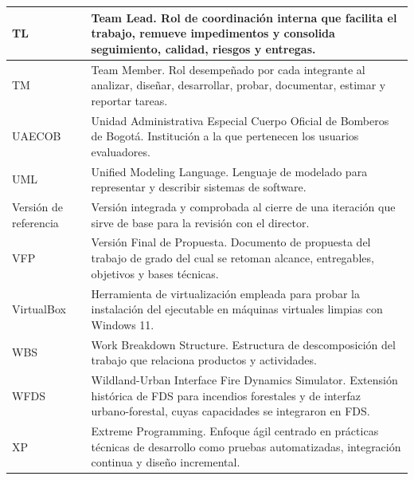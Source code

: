 \begin{longtable}{|p{0.29\dimexpr\linewidth-23pt\relax}|p{0.71\dimexpr\linewidth-23pt\relax}|}
TL & Team Lead. Rol de coordinación interna que facilita el trabajo, remueve impedimentos y consolida seguimiento, calidad, riesgos y entregas.\\\hline
TM & Team Member. Rol desempeñado por cada integrante al analizar, diseñar, desarrollar, probar, documentar, estimar y reportar tareas.\\\hline
UAECOB & Unidad Administrativa Especial Cuerpo Oficial de Bomberos de Bogotá. Institución a la que pertenecen los usuarios evaluadores.\\\hline
UML & Unified Modeling Language. Lenguaje de modelado para representar y describir sistemas de software.\\\hline
Versión de referencia & Versión integrada y comprobada al cierre de una iteración que sirve de base para la revisión con el director.\\\hline
VFP & Versión Final de Propuesta. Documento de propuesta del trabajo de grado del cual se retoman alcance, entregables, objetivos y bases técnicas.\\\hline
VirtualBox & Herramienta de virtualización empleada para probar la instalación del ejecutable en máquinas virtuales limpias con Windows 11.\\\hline
WBS & Work Breakdown Structure. Estructura de descomposición del trabajo que relaciona productos y actividades.\\\hline
WFDS & Wildland-Urban Interface Fire Dynamics Simulator. Extensión histórica de FDS para incendios forestales y de interfaz urbano-forestal, cuyas capacidades se integraron en FDS.\\\hline
XP & Extreme Programming. Enfoque ágil centrado en prácticas técnicas de desarrollo como pruebas automatizadas, integración continua y diseño incremental.\\\hline
\end{longtable}